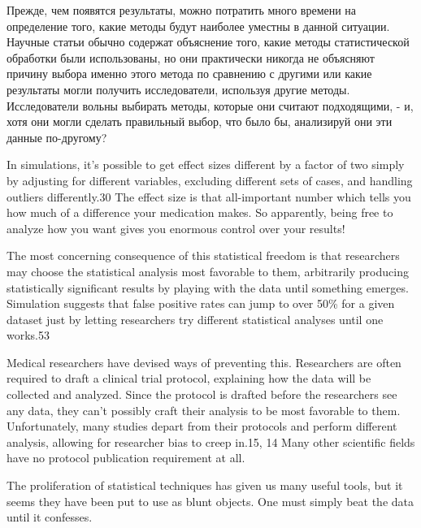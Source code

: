 Прежде, чем появятся результаты, можно потратить много времени на определение того, какие методы будут наиболее уместны в данной ситуации. Научные статьи обычно содержат объяснение того, какие методы статистической обработки были использованы, но они практически никогда не объясняют причину выбора именно этого метода по сравнению с другими или какие результаты могли получить исследователи, используя другие методы. Исследователи вольны выбирать методы, которые они считают подходящими, - и, хотя они могли сделать правильный выбор, что было бы, анализируй они эти данные по-другому?    



In simulations, it’s possible to get effect sizes different by a factor of two simply by adjusting for different variables, excluding different sets of cases, and handling outliers differently.30 The effect size is that all-important number which tells you how much of a difference your medication makes. So apparently, being free to analyze how you want gives you enormous control over your results!

The most concerning consequence of this statistical freedom is that researchers may choose the statistical analysis most favorable to them, arbitrarily producing statistically significant results by playing with the data until something emerges. Simulation suggests that false positive rates can jump to over 50\% for a given dataset just by letting researchers try different statistical analyses until one works.53

Medical researchers have devised ways of preventing this. Researchers are often required to draft a clinical trial protocol, explaining how the data will be collected and analyzed. Since the protocol is drafted before the researchers see any data, they can’t possibly craft their analysis to be most favorable to them. Unfortunately, many studies depart from their protocols and perform different analysis, allowing for researcher bias to creep in.15, 14 Many other scientific fields have no protocol publication requirement at all.

The proliferation of statistical techniques has given us many useful tools, but it seems they have been put to use as blunt objects. One must simply beat the data until it confesses.
